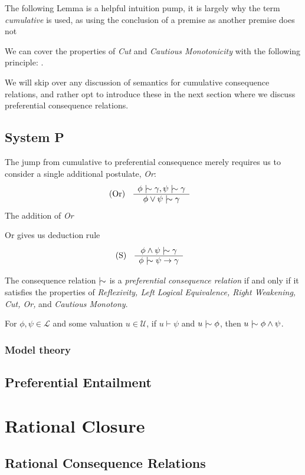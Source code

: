 The following Lemma is a helpful intuition pump, it is largely why the term \textit{cumulative} is used, as using the conclusion of a premise as another premise does not  \cite{gabbay1985theoreticalFoundations}
%
\begin{lemma}
\label{lemma:cut-cautious}
We can cover the properties of \emph{Cut} and \emph{Cautious Monotonicity} with the following principle: .
\end{lemma}


We will skip over any discussion of semantics for cumulative consequence relations, and rather opt to introduce these in the next section where we discuss preferential consequence relations.

\subsection{System P}
\label{subsection:system-P}

The jump from cumulative to preferential consequence merely requires us to consider a single additional postulate, \textit{Or}:
%
\begin{align}
\inferLeft{Or}{\phi \twiddle \gamma, \psi \twiddle \gamma}{\phi \lor \psi \twiddle \gamma}
\end{align}
The addition of \textit{Or}

Or gives us deduction rule
\begin{align}
\inferLeft{S}{\phi \land \psi \twiddle \gamma}{\phi \twiddle \psi \rightarrow \gamma}
\end{align}

\begin{definition}
\label{definition:preferential-relation}
The consequence relation $\twiddle$ is a \emph{preferential consequence relation} if and only if it satisfies the properties of \emph{Reflexivity, Left Logical Equivalence, Right Weakening, Cut, Or,} and \emph{Cautious Monotony}.
\end{definition}

\begin{lemma}
     For $\phi, \psi \in \mathcal{L}$ and some valuation $u \in \mathcal{U}$, if $u \vdash \psi$ and $u \twiddle \phi$, then $u \twiddle \phi \land \psi$.
\end{lemma}

\subsubsection{Model theory}
\begin{definition}
\label{definition:preferential-interpretation}


\end{definition}
\subsection{Preferential Entailment}

\section{Rational Closure}

\subsection{Rational Consequence Relations}
